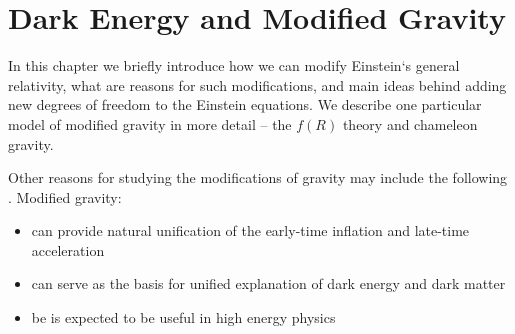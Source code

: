 \chapter{Dark Energy and Modified Gravity}
\label{chpt:de_mg}
In this chapter we briefly introduce how we can modify Einstein`s general relativity, what are reasons for such modifications, and main ideas behind adding new degrees of freedom to the Einstein equations. We describe one particular model of modified gravity in more detail -- the $f(R)$ theory and chameleon gravity.

Other reasons for studying the modifications of gravity may include the following . Modified gravity:
\begin{itemize}
	\item can provide natural unification of the early-time inflation and late-time acceleration 
	\item can serve as the basis for unified explanation of dark energy and dark matter 
	\item be is expected to be useful in high energy physics 
\end{itemize}







